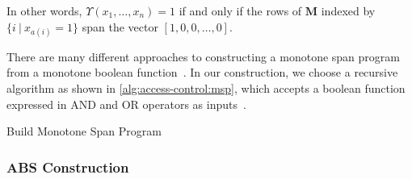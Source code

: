 In other words, $\Upsilon(x_1, \dots, x_n) = 1$ if and only if the rows of $\mathbf{M}$ indexed by $\{i~|~x_{a(i)} = 1 \}$ span the vector $[1, 0, 0, \dots, 0]$.

There are many different approaches to constructing a monotone span program from a monotone boolean function~\cite{Nikov:2004,Liu:2010}.
In our construction, we choose a recursive algorithm as shown in \cref{alg:access-control:msp}, which accepts a boolean function expressed in AND and OR operators as inputs~\cite{Nikov:2004}.

\begin{algorithm}[t]
  \caption{Build Monotone Span Program}\label{alg:access-control:msp}
\end{algorithm}

\subsubsection{ABS Construction}\label{sec:access-control:abs-cons}
\newcommand{\hash}{\textsf{hash}}

